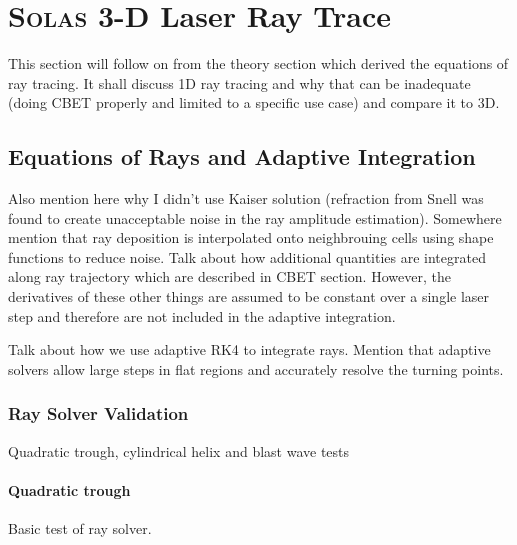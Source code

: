 \section{\textsc{Solas} 3-D Laser Ray Trace}

This section will follow on from the theory section which derived the equations of ray tracing.
It shall discuss 1D ray tracing and why that can be inadequate (doing CBET properly and limited to a specific use case) and compare it to 3D.


\subsection{Equations of Rays and Adaptive Integration}

Also mention here why I didn't use Kaiser solution (refraction from Snell was found to create unacceptable noise in the ray amplitude estimation).
Somewhere mention that ray deposition is interpolated onto neighbrouing cells using shape functions to reduce noise.
Talk about how additional quantities are integrated along ray trajectory which are described in CBET section.
However, the derivatives of these other things are assumed to be constant over a single laser step and therefore are not included in the adaptive integration.

Talk about how we use adaptive RK4 to integrate rays.
Mention that adaptive solvers allow large steps in flat regions and accurately resolve the turning points.

\subsubsection{Ray Solver Validation}

Quadratic trough, cylindrical helix and blast wave tests

\paragraph*{Quadratic trough}
Basic test of ray solver.

